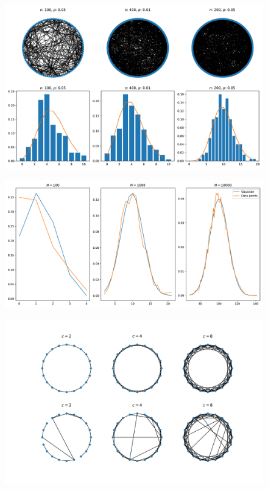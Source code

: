 \documentclass[a4paper, 12pt]{article}
\begin{document}

\begin{figure}[h!]
    \includegraphics[width=\linewidth]{../Erdos-Renyi/erdos-reyni.pdf}
\end{figure}

\begin{figure}[h!]
    \includegraphics[width=\linewidth]{../Erdos-Renyi/gaussian.pdf}
\end{figure}

\newpage

\begin{figure}[h!]
    \includegraphics[width=\linewidth]{../Watts-Strogatz/c_graph.pdf}
\end{figure}
\end{document}
